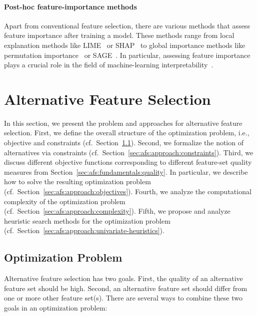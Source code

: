 \documentclass{article}
\theoremstyle{definition}
\begin{document}
\paragraph{Post-hoc feature-importance methods}

Apart from conventional feature selection, there are various methods that assess feature importance after training a model.
These methods range from local explanation methods like LIME~\cite{ribeiro2016should} or SHAP~\cite{lundberg2017unified} to global importance methods like permutation importance~\cite{breiman2001random} or SAGE~\cite{covert2020understanding}.
In particular, assessing feature importance plays a crucial role in the field of machine-learning interpretability~\cite{carvalho2019machine, molnar2020interpretable}.

\section{Alternative Feature Selection}
\label{sec:afs:approach}

In this section, we present the problem and approaches for alternative feature selection.
First, we define the overall structure of the optimization problem, i.e., objective and constraints (cf.~Section~\ref{sec:afs:approach:problem}).
Second, we formalize the notion of alternatives via constraints (cf.~Section~\ref{sec:afs:approach:constraints}).
Third, we discuss different objective functions corresponding to different feature-set quality measures from Section~\ref{sec:afs:fundamentals:quality}.
In particular, we describe how to solve the resulting optimization problem (cf.~Section~\ref{sec:afs:approach:objectives}).
Fourth, we analyze the computational complexity of the optimization problem (cf.~Section~\ref{sec:afs:approach:complexity}).
Fifth, we propose and analyze heuristic search methods for the optimization problem (cf.~Section~\ref{sec:afs:approach:univariate-heuristics}).

\subsection{Optimization Problem}
\label{sec:afs:approach:problem}

Alternative feature selection has two goals.
First, the quality of an alternative feature set should be high.
Second, an alternative feature set should differ from one or more other feature set(s).
There are several ways to combine these two goals in an optimization problem:
\end{document}
